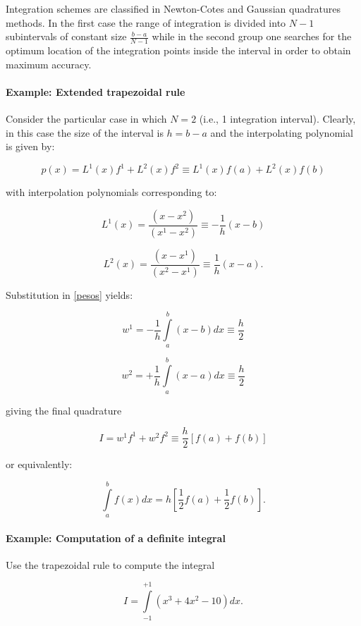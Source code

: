\begin{tcolorbox}
Integration schemes are classified in Newton-Cotes and Gaussian quadratures methods. In the first case the range of integration is divided into $N-1$ subintervals of constant size $\frac{b-a}{N-1}$ while in the second group one searches for the optimum location of the integration points inside the interval in order to obtain maximum accuracy. 
\end{tcolorbox}


\paragraph*{Example: Extended trapezoidal rule}
Consider the particular case in which $N=2$ (i.e., 1 integration interval). Clearly, in this case the size of the interval is $h=b-a$ and the interpolating polynomial is given by:

\[p(x) = {L^1}(x){f^1} + {L^2}(x){f^2} \equiv {L^1}(x)f(a) + {L^2}(x)f(b)\]

with interpolation polynomials corresponding to:

\[{L^1}(x) = \frac{{(x - {x^2})}}{{({x^1} - {x^2})}} \equiv  - \frac{1}{h}(x - b)\]

\[{L^2}(x) = \frac{{(x - {x^1})}}{{({x^2} - {x^1})}} \equiv \frac{1}{h}(x - a).\]

Substitution in \eqref{pesos} yields:

\[{w^1} =  - \frac{1}{h}\int\limits_a^b {(x - b)dx}  \equiv \frac{h}{2}\]

\[{w^2} =  + \frac{1}{h}\int\limits_a^b {(x - a)dx}  \equiv \frac{h}{2}\]

giving the final quadrature

\[I = {w^1}{f^1} + {w^2}{f^2} \equiv \frac{h}{2}\left[ {f(a) + f(b)} \right]\]

or equivalently:

\begin{equation}
\int\limits_a^b {f(x)dx = h\left[ {\frac{1}{2}{f(a)} + \frac{1}{2}{f(b)}} \right]}.
\label{trapecio}
\end{equation}

\paragraph*{Example: Computation of a definite integral}
Use the trapezoidal rule to compute the integral

\[I=\int\limits_{ - 1}^{ + 1} {({x^3} + 4{x^2} - 10)dx}.\]

